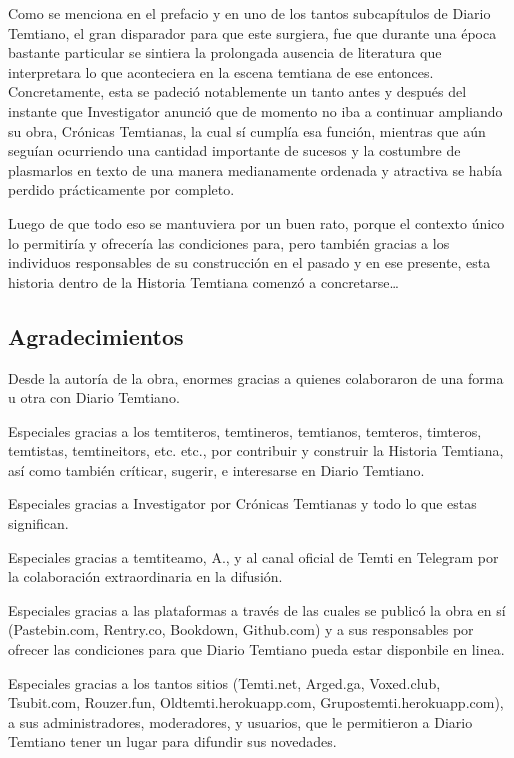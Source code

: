 \documentclass[
  spanish,
]{book}
\begin{document}
Como se menciona en el prefacio y en uno de los tantos subcapítulos de Diario Temtiano, el gran disparador para que este surgiera, fue que durante una época bastante particular se sintiera la prolongada ausencia de literatura que interpretara lo que aconteciera en la escena temtiana de ese entonces. Concretamente, esta se padeció notablemente un tanto antes y después del instante que Investigator anunció que de momento no iba a continuar ampliando su obra, Crónicas Temtianas, la cual sí cumplía esa función, mientras que aún seguían ocurriendo una cantidad importante de sucesos y la costumbre de plasmarlos en texto de una manera medianamente ordenada y atractiva se había perdido prácticamente por completo.

Luego de que todo eso se mantuviera por un buen rato, porque el contexto único lo permitiría y ofrecería las condiciones para, pero también gracias a los individuos responsables de su construcción en el pasado y en ese presente, esta historia dentro de la Historia Temtiana comenzó a concretarse\ldots{}

\hypertarget{agradecimientos}{%
\subsection*{Agradecimientos}\label{agradecimientos}}

Desde la autoría de la obra, enormes gracias a quienes colaboraron de una forma u otra con Diario Temtiano.

Especiales gracias a los temtiteros, temtineros, temtianos, temteros, timteros, temtistas, temtineitors, etc. etc., por contribuir y construir la Historia Temtiana, así como también críticar, sugerir, e interesarse en Diario Temtiano.

Especiales gracias a Investigator por Crónicas Temtianas y todo lo que estas significan.

Especiales gracias a temtiteamo, A., y al canal oficial de Temti en Telegram por la colaboración extraordinaria en la difusión.

Especiales gracias a las plataformas a través de las cuales se publicó la obra en sí (Pastebin.com, Rentry.co, Bookdown, Github.com) y a sus responsables por ofrecer las condiciones para que Diario Temtiano pueda estar disponbile en linea.

Especiales gracias a los tantos sitios (Temti.net, Arged.ga, Voxed.club, Tsubit.com, Rouzer.fun, Oldtemti.herokuapp.com, Grupostemti.herokuapp.com), a sus administradores, moderadores, y usuarios, que le permitieron a Diario Temtiano tener un lugar para difundir sus novedades.
\end{document}
